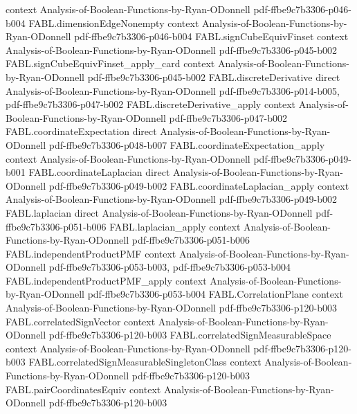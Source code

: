 \begin{theorem}
  {context}
  {Analysis-of-Boolean-Functions-by-Ryan-ODonnell}
  {pdf-ffbe9c7b3306-p046-b004}
\proofstep
  {FABL.dimensionEdgeNonempty}
  {context}
  {Analysis-of-Boolean-Functions-by-Ryan-ODonnell}
  {pdf-ffbe9c7b3306-p046-b004}
\proofstep
  {FABL.signCubeEquivFinset}
  {context}
  {Analysis-of-Boolean-Functions-by-Ryan-ODonnell}
  {pdf-ffbe9c7b3306-p045-b002}
\proofstep
  {FABL.signCubeEquivFinset_apply_card}
  {context}
  {Analysis-of-Boolean-Functions-by-Ryan-ODonnell}
  {pdf-ffbe9c7b3306-p045-b002}
\proofstep
  {FABL.discreteDerivative}
  {direct}
  {Analysis-of-Boolean-Functions-by-Ryan-ODonnell}
  {pdf-ffbe9c7b3306-p014-b005,
    pdf-ffbe9c7b3306-p047-b002}
\proofstep
  {FABL.discreteDerivative_apply}
  {context}
  {Analysis-of-Boolean-Functions-by-Ryan-ODonnell}
  {pdf-ffbe9c7b3306-p047-b002}
\proofstep
  {FABL.coordinateExpectation}
  {direct}
  {Analysis-of-Boolean-Functions-by-Ryan-ODonnell}
  {pdf-ffbe9c7b3306-p048-b007}
\proofstep
  {FABL.coordinateExpectation_apply}
  {context}
  {Analysis-of-Boolean-Functions-by-Ryan-ODonnell}
  {pdf-ffbe9c7b3306-p049-b001}
\proofstep
  {FABL.coordinateLaplacian}
  {direct}
  {Analysis-of-Boolean-Functions-by-Ryan-ODonnell}
  {pdf-ffbe9c7b3306-p049-b002}
\proofstep
  {FABL.coordinateLaplacian_apply}
  {context}
  {Analysis-of-Boolean-Functions-by-Ryan-ODonnell}
  {pdf-ffbe9c7b3306-p049-b002}
\proofstep
  {FABL.laplacian}
  {direct}
  {Analysis-of-Boolean-Functions-by-Ryan-ODonnell}
  {pdf-ffbe9c7b3306-p051-b006}
\proofstep
  {FABL.laplacian_apply}
  {context}
  {Analysis-of-Boolean-Functions-by-Ryan-ODonnell}
  {pdf-ffbe9c7b3306-p051-b006}
\proofstep
  {FABL.independentProductPMF}
  {context}
  {Analysis-of-Boolean-Functions-by-Ryan-ODonnell}
  {pdf-ffbe9c7b3306-p053-b003,
    pdf-ffbe9c7b3306-p053-b004}
\proofstep
  {FABL.independentProductPMF_apply}
  {context}
  {Analysis-of-Boolean-Functions-by-Ryan-ODonnell}
  {pdf-ffbe9c7b3306-p053-b004}
\proofstep
  {FABL.CorrelationPlane}
  {context}
  {Analysis-of-Boolean-Functions-by-Ryan-ODonnell}
  {pdf-ffbe9c7b3306-p120-b003}
\proofstep
  {FABL.correlatedSignVector}
  {context}
  {Analysis-of-Boolean-Functions-by-Ryan-ODonnell}
  {pdf-ffbe9c7b3306-p120-b003}
\proofstep
  {FABL.correlatedSignMeasurableSpace}
  {context}
  {Analysis-of-Boolean-Functions-by-Ryan-ODonnell}
  {pdf-ffbe9c7b3306-p120-b003}
\proofstep
  {FABL.correlatedSignMeasurableSingletonClass}
  {context}
  {Analysis-of-Boolean-Functions-by-Ryan-ODonnell}
  {pdf-ffbe9c7b3306-p120-b003}
\proofstep
  {FABL.pairCoordinatesEquiv}
  {context}
  {Analysis-of-Boolean-Functions-by-Ryan-ODonnell}
  {pdf-ffbe9c7b3306-p120-b003}

\end{theorem}

